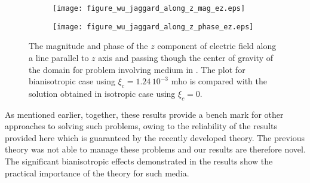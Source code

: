 \begin{figure}
\centering
\begin{subfigure}[b]{0.49\textwidth}
\texttt{[image: figure\_wu\_jaggard\_along\_z\_mag\_ez.eps]}
\end{subfigure}
%
\begin{subfigure}[b]{0.49\textwidth}
\centering
\texttt{[image: figure\_wu\_jaggard\_along\_z\_phase\_ez.eps]}
\end{subfigure}
\caption{The magnitude and phase of the $z$ component of electric field along a line parallel to $z$ axis 
and passing though the center of gravity of the domain for problem involving 
medium in \cite{wujaggard}. 
The plot for bianisotropic case  using $\xi_c = 1.24\,10^{-3}$ mho is compared with 
the solution obtained in isotropic case using $\xi_c = 0$.}
\label{fi:wu_jaggard_zaxis_ez}
\end{figure}

As mentioned earlier, together, these results provide a bench mark for other approaches 
to solving such problems, owing to the reliability of the results provided here which
is guaranteed by the recently developed theory.
The previous theory \cite{bianisotropi_m3as} was not able to manage these problems and 
our results are therefore novel.
The significant bianisotropic effects demonstrated in the results show the practical
importance of the theory for such media.
